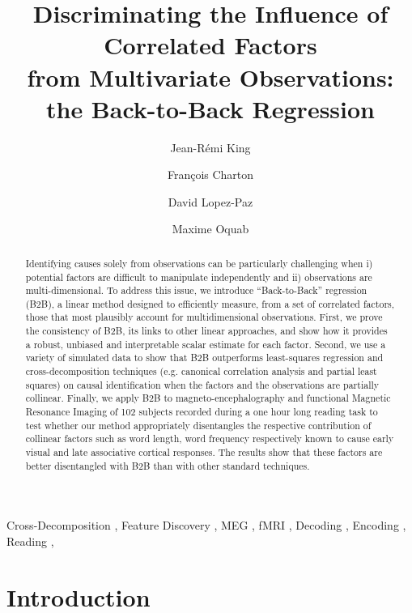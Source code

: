 \documentclass[preprint,12pt,3p]{elsarticle}
\begin{document}
\begin{frontmatter}

\title{Discriminating the Influence of Correlated Factors \\from Multivariate Observations: the Back-to-Back Regression}

\author[1,2]{Jean-Rémi King}

\author[2]{Fran\c{c}ois Charton}
\author[2]{David Lopez-Paz}
\author[2]{Maxime Oquab}
\address[1]{Laboratoire des systèmes perceptifs, PSL University, CNRS}
\address[2]{Facebook AI}


\begin{abstract}
Identifying causes solely from observations can be particularly challenging when
i) potential factors are difficult to manipulate independently and ii)
observations are multi-dimensional. To address this issue, we
introduce ``Back-to-Back'' regression (B2B), a linear method designed to efficiently
measure, from a set of correlated factors, those that most plausibly account for
multidimensional observations. First, we prove the consistency of B2B, its links to
other linear approaches, and show how it provides a robust, unbiased and
interpretable scalar estimate for each factor.
Second, we use a variety of simulated data to show that B2B outperforms
least-squares regression and cross-decomposition techniques (e.g. canonical
correlation analysis and partial least squares) on causal identification when
the factors and the observations are partially collinear.
Finally, we apply B2B to magneto-encephalography and functional Magnetic
Resonance Imaging of 102 subjects
recorded during a one hour long reading task to test whether our method appropriately disentangles
the respective contribution of collinear factors such as word length, word
frequency respectively known to cause early visual and late associative cortical
responses. The results
show that these factors are better disentangled with B2B than with
other standard techniques.
\end{abstract}


\begin{keyword}
  Cross-Decomposition \sep
  Feature Discovery \sep
  MEG \sep
  fMRI \sep
  Decoding \sep
  Encoding \sep
  Reading \sep
\end{keyword}

\end{frontmatter}

\linenumbers

\section{Introduction}

\end{document}
